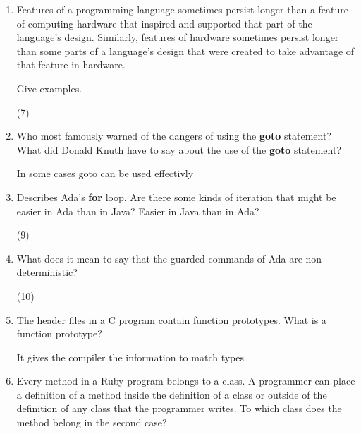 \begin{enumerate}
  \item Features of a programming language sometimes persist
    longer than a feature of computing hardware that inspired
    and supported that part of the language's design.
    Similarly, features of hardware sometimes persist longer
    than some parts of a language's design that were created
    to take advantage of that feature in hardware.

    Give examples.

 \begin{answer}
    (7)
     \end{answer}

  \item Who most famously warned of the dangers of using the
    \textbf{goto} statement? What did Donald Knuth have to
    say about the use of the \textbf{goto} statement?

 \begin{answer}
    In some cases goto can be used effectivly
     \end{answer}

  \item Describes Ada's \textbf{for} loop. Are there some
    kinds of iteration that might be easier in Ada than
    in Java? Easier in Java than in Ada?

 \begin{answer}
    (9)
   \end{answer}
   
  \item What does it mean to say that the guarded commands
    of Ada are non-deterministic?

 \begin{answer}
    (10)
     \end{answer}

  \item The header files in a C program contain function
    prototypes. What is a function prototype?

 \begin{answer}
    It gives the compiler the information to match types
 \end{answer}

  \item Every method in a Ruby program belongs to a class.
    A programmer can place a definition of a method inside
    the definition of a class or outside of the definition
    of any class that the programmer writes. To which class
    does the method belong in the second case?


\end{enumerate}
